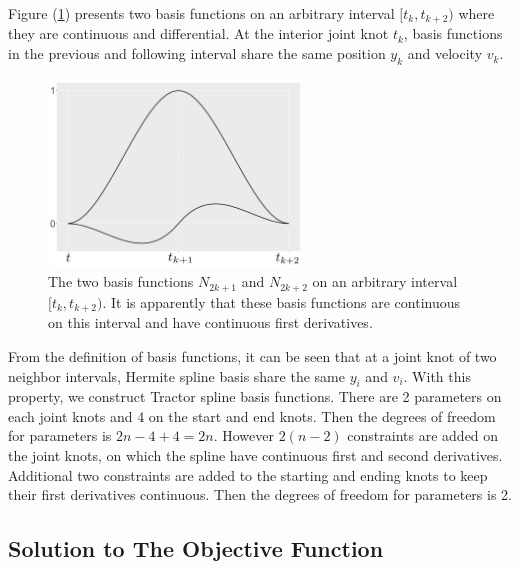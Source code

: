 Figure (\ref{basisfigure}) presents two basis functions on an arbitrary interval $[t_k, t_{k+2} )$ where they are continuous and differential. At the interior joint knot $t_k$, basis functions in the previous and following interval share the same position $y_k$ and velocity $v_k$. 
\begin{figure}[h] 
\centering
\includegraphics[width=0.6\textwidth, height=5cm]{Chapters/02TractorSplineTheory/plot/pptbasisplot}
\caption{The two basis functions $N_{2k+1}$ and $N_{2k+2}$ on an arbitrary interval $[t_k, t_{k+2})$. It is apparently that these basis functions are continuous on this interval and have continuous first derivatives.}
\label{basisfigure}
\end{figure}


From the definition of basis functions, it can be seen that at a joint knot of two neighbor intervals, Hermite spline basis share the same $y_i$ and $v_i$. With this property, we construct Tractor spline basis functions. There are 2 parameters on each joint knots and 4 on the start and end knots. Then the degrees of freedom for parameters is $2n-4+4=2n$. However $2(n-2)$ constraints are added on the joint knots, on which the spline have continuous first and second derivatives. Additional two constraints are added to the starting and ending knots to keep their first derivatives continuous. Then the degrees of freedom for parameters is 2. 


\subsection{Solution to The Objective Function}

